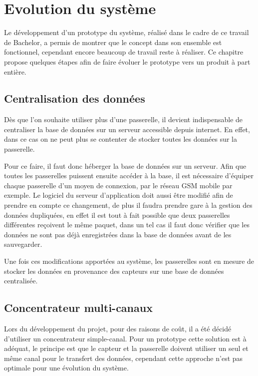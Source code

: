 
\chapter{Evolution du système}\label{ch:produit}

Le développement d'un prototype du système, réalisé dans le cadre de ce travail de Bachelor, a permis de montrer que le concept dans son ensemble est fonctionnel, cependant encore beaucoup de travail reste à réaliser. Ce chapitre propose quelques étapes afin de faire évoluer le prototype vers un produit à part entière.

\section{Centralisation des données}

Dès que l'on souhaite utiliser plus d'une passerelle, il devient indispensable de centraliser la base de données sur un serveur accessible depuis internet. En effet, dans ce cas on ne peut plus se contenter de stocker toutes les données sur la passerelle.

Pour ce faire, il faut donc héberger la base de données sur un serveur. Afin que toutes les passerelles puissent ensuite accéder à la base, il est nécessaire d'équiper chaque passerelle d'un moyen de connexion, par le réseau GSM mobile par exemple. Le logiciel du serveur d'application doit aussi être modifié afin de prendre en compte ce changement, de plus il faudra prendre gare à la gestion des données dupliquées, en effet il est tout à fait possible que deux passerelles différentes reçoivent le même paquet, dans un tel cas il faut donc vérifier que les données ne sont pas déjà enregistrées dans la base de données avant de les sauvegarder.

Une fois ces modifications apportées au système, les passerelles sont en mesure de stocker les données en provenance des capteurs sur une base de données centralisée.

\section{Concentrateur multi-canaux}


Lors du développement du projet, pour des raisons de coût, il a été décidé d'utiliser un concentrateur simple-canal. Pour un prototype cette solution est à adéquat, le principe est que le capteur et la passerelle doivent utiliser un seul et même canal pour le transfert des données, cependant cette approche n'est pas optimale pour une évolution du système.

